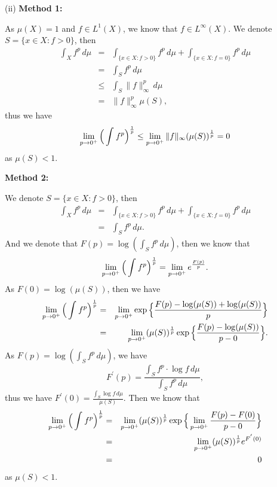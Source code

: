 \documentclass[12pt]{article}
\begin{document}
(ii) 
\textbf{Method 1:}

As $\mu(X) = 1$ and $f \in L^{1}(X)$, we know that $f \in L^{\infty} (X)$. We denote $S = \{x \in X: f > 0\}$, then
\begin{eqnarray*}
    \int_{X}^{} f^{p} \, d \mu & = & \int_{\{x \in X: f > 0\}}^{} f^{p} \, d \mu + \int_{\{x \in X: f = 0\}}^{} f^{p} \, d \mu \\
    & = & \int_{S}^{} f^{p} \, d \mu \\
    & \leq & \int_{S}^{} \|f\|_{\infty}^{p} \, d \mu \\
    & = & \|f\|_{\infty}^{p} \mu(S),
\end{eqnarray*}
thus we have
\begin{equation*}
    \lim_{p \to 0^{+}} \Big{(} \int_{}^{} f^{p} \Big{)}^{\frac{1}{p}} \leq \lim_{p \to 0^{+}} \|f\|_{\infty} (\mu(S))^{\frac{1}{p}} = 0
\end{equation*}
as $\mu(S) < 1$. 

\textbf{Method 2:}

We denote $S = \{x \in X: f > 0\}$, then
\begin{eqnarray*}
    \int_{X}^{} f^{p} \, d \mu & = & \int_{\{x \in X: f > 0\}}^{} f^{p} \, d \mu + \int_{\{x \in X: f = 0\}}^{} f^{p} \, d \mu \\
    & = & \int_{S}^{} f^{p} \, d \mu.
\end{eqnarray*}
And we denote that $F(p) = \log (\int_{S}^{} f^{p} \, d \mu)$, then we know that
\begin{equation*}
    \lim_{p \to 0^{+}} \Big{(} \int_{}^{} f^{p} \Big{)}^{\frac{1}{p}} = \lim_{p \to 0^{+}} e^{\frac{F(p)}{p}}.
\end{equation*}
As $F(0) = \log(\mu(S))$, then we have
\begin{eqnarray*}
    \lim_{p \to 0^{+}} \Big{(} \int_{}^{} f^{p} \Big{)}^{\frac{1}{p}} & = & \lim_{p \to 0^{+}} \exp \Big{\{} \frac{F(p) - \log(\mu(S)) + \log(\mu(S))}{p} \Big{\}} \\
    & = & \lim_{p \to 0^{+}} (\mu(S))^{\frac{1}{p}} \exp \Big{\{} \frac{F(p) - \log(\mu(S))}{p - 0} \Big{\}}.
\end{eqnarray*}
As $F(p) = \log (\int_{S}^{} f^{p} \, d \mu)$, we have 
\begin{equation*}
    F^{'}(p) = \frac{\int_{S}^{} f^{p} \cdot \log f \, d \mu}{\int_{S}^{} f^{p} \, d \mu},
\end{equation*}
thus we have $F^{'}(0) = \frac{\int_{S}^{} \log f \, d \mu}{\mu(S)}$. Then we know that
\begin{eqnarray*}
    \lim_{p \to 0^{+}} \Big{(} \int_{}^{} f^{p} \Big{)}^{\frac{1}{p}} & = & \lim_{p \to 0^{+}} (\mu(S))^{\frac{1}{p}} \exp \Big{\{} \lim_{p \to 0^{+}} \frac{F(p) - F(0)}{p - 0} \Big{\}} \\
    & = & \lim_{p \to 0^{+}} (\mu(S))^{\frac{1}{p}} e^{F^{'}(0)} \\
    & = & 0
\end{eqnarray*}
as $\mu(S) < 1$.
\end{document}
